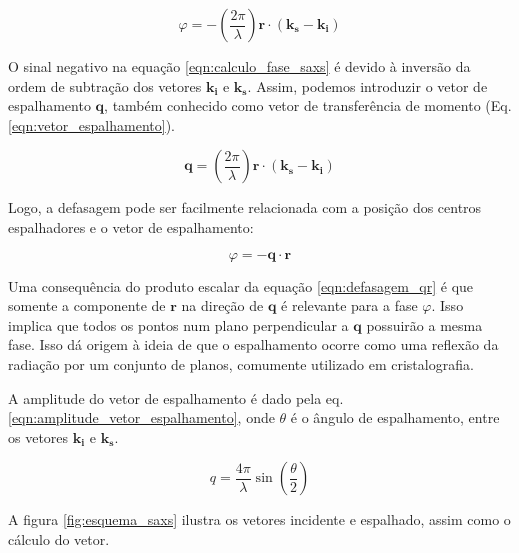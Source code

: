 		\begin{equation}
			\varphi = - \left( \dfrac{2\pi}{\lambda} \right) \mathbf{r} \cdot \left( \mathbf{k_s} - \mathbf{k_i} \right)
			\label{eqn:calculo_fase_saxs}
		\end{equation}
		
		O sinal negativo na equação \ref{eqn:calculo_fase_saxs} é devido à inversão da ordem de subtração dos vetores \(\mathbf{k_i}\) e \(\mathbf{k_s}\). Assim, podemos introduzir o vetor de espalhamento \(\mathbf{q}\), também conhecido como vetor de transferência de momento (Eq. \ref{eqn:vetor_espalhamento}).
		
		\begin{equation}
			\mathbf{q} = \left( \dfrac{2\pi}{\lambda} \right) \mathbf{r} \cdot \left( \mathbf{k_s} - \mathbf{k_i} \right)
			\label{eqn:vetor_espalhamento}
		\end{equation} 
		
		Logo, a defasagem pode ser facilmente relacionada com a posição dos centros espalhadores e o vetor de espalhamento:
		
		\begin{equation}
			\varphi = - \mathbf{q} \cdot \mathbf{r}
			\label{eqn:defasagem_qr}
		\end{equation}
		
		Uma consequência do produto escalar da equação \ref{eqn:defasagem_qr} é que somente a componente de \(\mathbf{r}\) na direção de \(\mathbf{q}\) é relevante para a fase \(\varphi\). Isso implica que todos os pontos num plano perpendicular a \(\mathbf{q}\) possuirão a mesma fase. Isso dá origem à ideia de que o espalhamento ocorre como uma reflexão da radiação por um conjunto de planos, comumente utilizado em cristalografia.
		
		A amplitude do vetor de espalhamento é dado pela eq. \ref{eqn:amplitude_vetor_espalhamento}, onde \(\theta\) é o ângulo de espalhamento, entre os vetores \(\mathbf{k_i}\) e \(\mathbf{k_s}\).
		
		\begin{equation}
		q = \dfrac{4\pi}{\lambda} \sin\left(\dfrac{\theta}{2}\right)
		\label{eqn:amplitude_vetor_espalhamento}
		\end{equation} 
		
		A figura \ref{fig:esquema_saxs} ilustra os vetores incidente e espalhado, assim como o cálculo do vetor.
		
